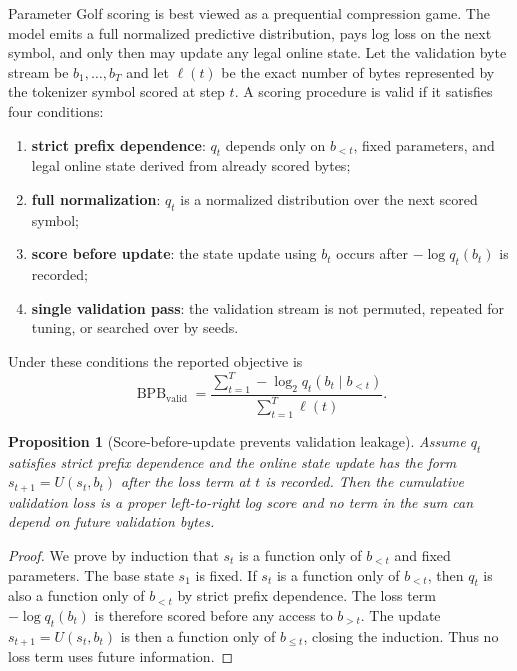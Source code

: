 \documentclass[11pt]{article}
\theoremstyle{definition}
\theoremstyle{plain}
\newtheorem{proposition}[definition]{Proposition}
\theoremstyle{remark}
\numberwithin{equation}{section}
\begin{document}
Parameter Golf scoring is best viewed as a prequential compression game.  The model emits a full normalized predictive distribution, pays log loss on the next symbol, and only then may update any legal online state.  Let the validation byte stream be $b_1,\dots,b_T$ and let $\ell(t)$ be the exact number of bytes represented by the tokenizer symbol scored at step $t$.  A scoring procedure is valid if it satisfies four conditions:
\begin{enumerate}[leftmargin=2em]
  \item \textbf{strict prefix dependence}: $q_t$ depends only on $b_{<t}$, fixed parameters, and legal online state derived from already scored bytes;
  \item \textbf{full normalization}: $q_t$ is a normalized distribution over the next scored symbol;
  \item \textbf{score before update}: the state update using $b_t$ occurs after $-\log q_t(b_t)$ is recorded;
  \item \textbf{single validation pass}: the validation stream is not permuted, repeated for tuning, or searched over by seeds.
\end{enumerate}
Under these conditions the reported objective is
\begin{equation}
  \operatorname{BPB}_{\mathrm{valid}}
  =\frac{\sum_{t=1}^{T}-\log_2 q_t(b_t\mid b_{<t})}{\sum_{t=1}^{T}\ell(t)}.
\end{equation}

\begin{proposition}[Score-before-update prevents validation leakage]
Assume $q_t$ satisfies strict prefix dependence and the online state update has the form $s_{t+1}=U(s_t,b_t)$ after the loss term at $t$ is recorded.  Then the cumulative validation loss is a proper left-to-right log score and no term in the sum can depend on future validation bytes.
\end{proposition}

\begin{proof}
We prove by induction that $s_t$ is a function only of $b_{<t}$ and fixed parameters.  The base state $s_1$ is fixed.  If $s_t$ is a function only of $b_{<t}$, then $q_t$ is also a function only of $b_{<t}$ by strict prefix dependence.  The loss term $-\log q_t(b_t)$ is therefore scored before any access to $b_{>t}$.  The update $s_{t+1}=U(s_t,b_t)$ is then a function only of $b_{\le t}$, closing the induction.  Thus no loss term uses future information.
\end{proof}
\end{document}
